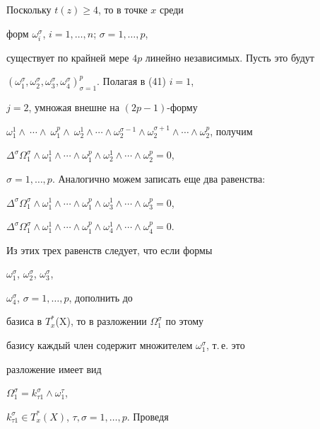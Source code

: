 \begin{pf} Поскольку $t(z)\ge 4$, то в точке $x$ среди


форм $\omega^{\sigma}_i$, $i=1,\dotsc,n$; $\sigma=1,\dotsc,p$,


существует по крайней мере $4p$ линейно независимых. Пусть это будут


$(\omega^{\sigma}_1,\omega^{\sigma}_2,\omega^{\sigma}_3,


\omega^{\sigma}_4)_{\sigma=1}^p$. Полагая в (41) $i=1$,


$j=2$, умножая внешне на $(2p-1)$-форму


$\omega^1_1\wedge~\cdots\wedge~\omega^p_1\wedge~\omega^1_2


\wedge\dotsb\wedge\omega^{\sigma-1}_2\wedge


\omega^{\sigma+1}_2\wedge


\dotsb\wedge\omega^p_2$, получим


$\Delta^{\sigma}\Omega^{\sigma}_1


\wedge\omega^1_1\wedge\dotsb\wedge\omega^p_1\wedge\omega^1_2


\wedge\dotsb\wedge\omega^p_2=0$,


$\sigma=1,\dotsc,p$. Аналогично можем записать еще два равенства:


$\Delta^{\sigma}\Omega^{\sigma}_1


\wedge\omega^1_1\wedge\dotsb\wedge\omega^p_1\wedge\omega^1_3


\wedge\dotsb\wedge\omega^p_3=0$,


$\Delta^{\sigma}\Omega^{\sigma}_1


\wedge\omega^1_1\wedge\dotsb\wedge\omega^p_1\wedge\omega^1_4


\wedge\dotsb\wedge\omega^p_4=0$.


Из этих трех равенств следует, что если формы


$\omega^{\sigma}_1$, $\omega^{\sigma}_2$, $\omega^{\sigma}_3$,


$\omega^{\sigma}_4$, $\sigma=1,\dotsc,p$, дополнить до


базиса в $T^*_x$(X), то в разложении $\Omega^{\sigma}_1$ по этому


базису каждый член содержит множителем $\omega^{\sigma}_1$, т.\,е. это


разложение имеет вид


$\Omega^{\sigma}_1=k^{\sigma}_{\tau1}\wedge\omega^{\tau}_1$,


$k^{\sigma}_{\tau1}\in T^*_x(X)$, $\tau,\sigma=1,\dotsc,p$. Проведя



\end{pf}
